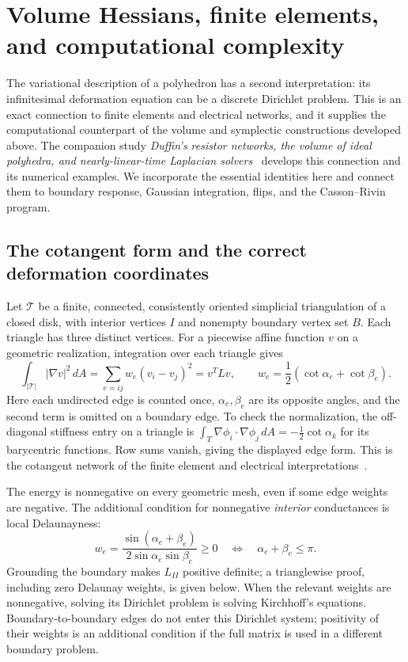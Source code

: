 \section{Volume Hessians, finite elements, and computational complexity}
\label{sec:ipolybridge}

The variational description of a polyhedron has a second interpretation:
its infinitesimal deformation equation can be a discrete Dirichlet
problem. This is an exact connection to finite elements and electrical
networks, and it supplies the computational counterpart of the volume
and symplectic constructions developed above. The companion study
\emph{Duffin's resistor networks, the volume of ideal polyhedra, and
nearly-linear-time Laplacian solvers}~\cite{IpolyStudy} develops this
connection and its numerical examples. We incorporate the essential
identities here and connect them to boundary response, Gaussian
integration, flips, and the Casson--Rivin program.

\subsection{The cotangent form and the correct deformation coordinates}
\label{subsec:ipolyCoordinates}

Let $\mathcal T$ be a finite, connected, consistently oriented simplicial
triangulation of a closed disk, with interior vertices $I$ and nonempty
boundary vertex set $B$. Each triangle has three distinct vertices.
For a piecewise affine function $v$ on a
geometric realization, integration over each triangle gives
\begin{equation}
 \int_{|\mathcal T|}|\nabla v|^2\,dA
 =\sum_{e=ij}w_e(v_i-v_j)^2=v^TLv,
 \qquad
 w_e=\frac12(\cot\alpha_e+\cot\beta_e).
 \label{eq:ipolyFEM}
\end{equation}
Here each undirected edge is counted once, $\alpha_e,\beta_e$ are its
opposite angles, and the second term is omitted on a boundary edge.
To check the normalization, the
off-diagonal stiffness entry on a triangle is
$\int_T\nabla\phi_i\cdot\nabla\phi_j\,dA=-\tfrac12\cot\alpha_k$
for its barycentric functions. Row sums vanish, giving the displayed
edge form. This is the cotangent network of the finite element and
electrical interpretations~\cite{DuffinNetworks}.

The energy is nonnegative on every geometric mesh, even if some edge
weights are negative. The additional condition for nonnegative
\emph{interior} conductances is local Delaunayness:
\begin{equation}
 w_e=\frac{\sin(\alpha_e+\beta_e)}
              {2\sin\alpha_e\sin\beta_e}\ge0
 \quad\Longleftrightarrow\quad \alpha_e+\beta_e\le\pi.
 \label{eq:ipolyDelaunayweight}
\end{equation}
Grounding the boundary makes $L_{II}$ positive definite; a trianglewise
proof, including zero Delaunay weights, is given below. When the relevant
weights are nonnegative, solving its Dirichlet problem is solving
Kirchhoff's equations. Boundary-to-boundary edges do not enter
this Dirichlet system; positivity of their weights is an additional
condition if the full matrix is used in a different boundary problem.

